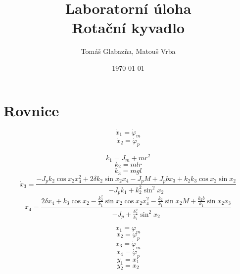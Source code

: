 \documentclass[11pt,a4paper]{article}
\title{%
  Laboratorní úloha \\
  \large Rotační kyvadlo}
\author{Tomáš Glabazňa, Matouš Vrba}
\date{\today}
\begin{document}
\maketitle

\newcommand{\xd}[1]{\dot{x}_{#1}} %
\newcommand{\phid}[1]{\dot{\varphi}_{#1}}
\newcommand{\phin}[1]{\varphi_{#1}} %

\section*{Rovnice}
$$
\xd{1} = \phid{m}
$$
$$
\xd{2} = \phid{p}
$$

\newcommand{\coss}[1]{\cos{#1}}
\newcommand{\sinn}[1]{\sin{#1}}
\newcommand{\sinnN}[1]{\sin^2{#1}} %
$$
k_1 = J_m + m r^2
$$
$$
k_2 = m l r
$$
$$
k_3 = m g l
$$
$$
\xd{3} =
\frac{
	-J_p k_2 \coss{x_2} x_4^2 + 2 \delta k_2 \sinn{x_2} x_4 - J_p M + J_p b x_3 	+ k_2 k_3 \coss{x_2} \sinn{x_2}
}{
 	-J_p k_1 + k_2^2 \sinnN{x_2}
}
$$
$$
\xd{4} =
\frac{
	2 \delta x_4 + k_3 \coss{x_2} - \frac{k_2^2}{k_1} \sinn{x_2} \coss{x_2} 			 	x_4^2 - \frac{k_2}{k_1} \sinn{x_2} M + \frac{k_2 b}{k_1} \sinn{x_2} x_3
}{
	-J_p + \frac{k_2^2}{k_1} \sinnN{x_2}
}
$$

$$
x_1 = \phin{m}
$$
$$
x_2 = \phin{p}
$$
$$
x_3 = \phid{m}
$$
$$
x_4 = \phid{p}
$$
$$
y_1 = x_1
$$
$$
y_2 = x_2
$$
\end{document}
